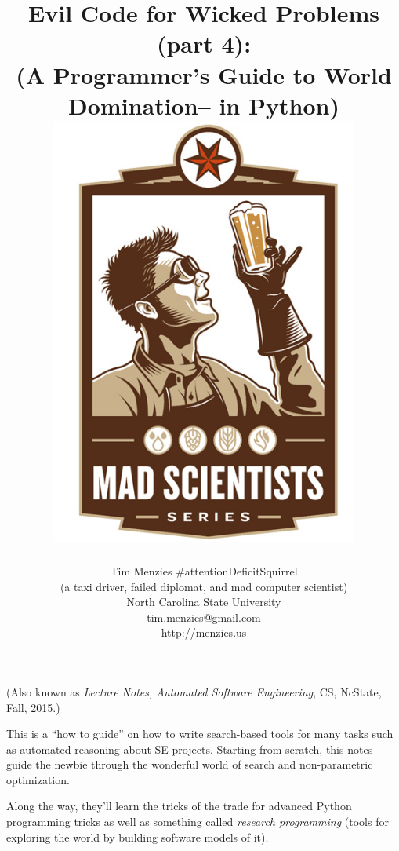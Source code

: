 \documentclass[9pt,twocolumn]{article}
\date{}
\begin{document}
 


\onecolumn
\title{{\bf Evil Code for Wicked Problems (part 4):\\
  (A Programmer's Guide to World Domination-- in Python)}\\
\vspace{5mm} \includegraphics[width=4in]{img/six.jpg}}
\author{Tim Menzies \#attentionDeficitSquirrel\\(a taxi driver, failed diplomat, and
  mad computer scientist)\\
  North Carolina State University\\tim.menzies{@}gmail.com\\http://menzies.us}

\maketitle
\begin{center}
 


(Also known as {\em Lecture Notes, Automated
  Software Engineering}, CS, NcState, Fall, 2015.)


  This is a ``how to guide'' on how to write search-based tools for many tasks such as automated
  reasoning about SE projects. Starting
  from scratch, this notes guide the newbie
  through the wonderful world of search and
  non-parametric optimization.

  Along the way,
  they'll learn the tricks of the
  trade for advanced Python programming
  tricks as well as something called {\em research programming}
  (tools for exploring the world by building software models
  of it).
  

  \end{center}
\clearpage
\twocolumn
\end{document}
